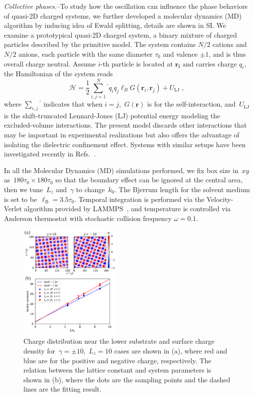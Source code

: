 \documentclass[aps,prl,reprint,showpacs,floatfix,superscriptaddress]{revtex4-2}
\newcommand{\V}[1]{\boldsymbol{#1}} %
\begin{document}
\textit{Collective phases.}--To study how the oscillation can influence the phase behaviors of quasi-2D charged systems, we further developed a molecular dynamics (MD) algorithm by inducing idea of Ewald splitting, details are shown in SI.
We examine a prototypical quasi-2D charged system, a binary mixture of charged particles described by the primitive model.
The system contains $N/2$ cations and $N/2$ anions, each particle with the same diameter $\tau_0$ and valence $\pm 1$, and is thus overall charge neutral.
Assume $i$-th particle is located at $\V{r_i}$ and carries charge $q_i$, the Hamiltonian of the system reads
\begin{equation}
   \mathcal H = \frac{1}{2} \sum_{i,j=1}^{N}{}^\prime q_i q_j \ell_B G(\V r_i, \V r_j) + U_{\mathrm{LJ}}\;,\label{eq:Hamiltonian}
\end{equation}
where $\sum_{i,j}{}^\prime$ indicates that when $i=j$,~$G(\V r)$ is for the self-interaction, and~$U_{\mathrm{LJ}}$ is the shift-truncated Lennard-Jones (LJ) potential energy modeling the excluded-volume interactions.
The present model discards other interactions that may be important in experimental realizations but also offers the advantage of isolating the dielectric confinement effect.
Systems with similar setups have been investigated recently in Refs.~\cite{dos2017simulations,liang2020harmonic,yuan2021particle}.


In all the Molecular Dynamics (MD) simulations performed, we fix box size in~$xy$ as~$180\tau_0\times 180\tau_0$ so that the boundary effect can be ignored at the central area, then we tune~$L_z$ and~$\gamma$ to change~$k_0$.
The Bjerrum length for the solvent medium is set to be~$\ell_{\mathrm B} = 3.5 \tau_0$.
Temporal integration is performed via the Velocity-Verlet algorithm provided by LAMMPS~\cite{LAMMPS}, and temperature is controlled via Anderson thermostat with stochastic collision frequency $\omega = 0.1$. 

\begin{figure}
	\centering
	\includegraphics[width=0.45\textwidth]{figs/fig3.pdf}
	\caption{\label{fig:MD} 
        Charge distribution near the lower substrate and surface charge density for~$\gamma = \pm 10$,~$L_z = 10$ cases are shown in (a), where red and blue are for the positive and negative charge, respectively.
        The relation between the lattice constant and system parameters is shown in (b), where the dots are the sampling points and the dashed lines are the fitting result.
	}
\end{figure}
\end{document}
